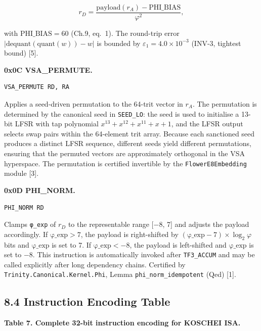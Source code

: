 \[r_D = \frac{\text{payload}(r_A) - \text{PHI\_BIAS}}{\varphi^2},\]

with \(\text{PHI\_BIAS} = 60\) (Ch.9, eq.~1).
The round-trip error
\(|\text{dequant}(\text{quant}(w)) - w|\) is
bounded by \(\varepsilon_1 = 4.0 \times 10^{-3}\)
(INV-3, tightest bound) [5].

\textbf{0x0C VSA\_PERMUTE.}

\begin{verbatim}
VSA_PERMUTE RD, RA
\end{verbatim}

Applies a seed-driven permutation to the 64-trit
vector in \(r_A\). The permutation is determined by
the canonical seed in \texttt{SEED\_LO}:
the seed is used to initialise a 13-bit LFSR with
tap polynomial \(x^{13} + x^{12} + x^{11} + x +
1\), and the LFSR output selects swap pairs within
the 64-element trit array. Because each sanctioned
seed produces a distinct LFSR sequence, different
seeds yield different permutations, ensuring that
the permuted vectors are approximately orthogonal
in the VSA hyperspace. The permutation is
certified invertible by the
\texttt{FlowerE8Embedding} module [3].

\textbf{0x0D PHI\_NORM.}

\begin{verbatim}
PHI_NORM RD
\end{verbatim}

Clamps \texttt{φ\_exp} of \(r_D\) to the
representable range {[}−8, 7{]} and adjusts the
payload accordingly. If
\(\text{φ\_exp} > 7\), the payload is right-shifted
by \((\text{φ\_exp} - 7) \times \log_2\varphi\)
bits and \(\text{φ\_exp}\) is set to 7. If
\(\text{φ\_exp} < -8\), the payload is left-shifted
and \(\text{φ\_exp}\) is set to $-$8. This
instruction is automatically invoked after
\texttt{TF3\_ACCUM} and may be called explicitly
after long dependency chains. Certified by
\texttt{Trinity.Canonical.Kernel.Phi}, Lemma
\texttt{phi\_norm\_idempotent} (Qed) [1].

\subsection{8.4 Instruction Encoding
Table}\label{fa_26:instruction-encoding-table}

\textbf{Table 7. Complete 32-bit instruction
encoding for KOSCHEI ISA.}

